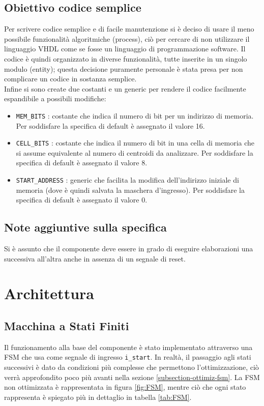 \documentclass{article}
\begin{document}
\subsection{Obiettivo codice semplice}
Per scrivere codice semplice e di facile manutenzione si è deciso di usare il meno possibile funzionalità algoritmiche (process), ciò per cercare di non utilizzare il linguaggio VHDL come se fosse un linguaggio di programmazione software. Il codice è quindi organizzato in diverse funzionalità, tutte inserite in un singolo modulo (entity); questa decisione puramente personale è stata presa per non complicare un codice in sostanza semplice.\\
Infine si sono create due costanti e un generic per rendere il codice facilmente espandibile a possibili modifiche:
\begin{itemize}
    \item \verb^MEM_BITS^ : costante che indica il numero di bit per un indirizzo di memoria. Per soddisfare la specifica di default è assegnato il valore 16.
    \item \verb^CELL_BITS^ : costante che indica il numero di bit in una cella di memoria che si assume equivalente al numero di centroidi da analizzare. Per soddisfare la specifica di default è assegnato il valore 8.
    \item \verb^START_ADDRESS^ : generic che facilita la modifica dell'indirizzo iniziale di memoria (dove è quindi salvata la maschera d'ingresso). Per soddisfare la specifica di default è assegnato il valore 0.
\end{itemize}

\subsection{Note aggiuntive sulla specifica}
Si è assunto che il componente deve essere in grado di eseguire elaborazioni una successiva all'altra anche in assenza di un segnale di reset.

\vspace{4mm}
\titlerule[0.4pt]


\pagebreak
\section{Architettura}

\subsection{Macchina a Stati Finiti}
Il funzionamento alla base del componente è stato implementato attraverso una FSM che usa come segnale di ingresso \verb^i_start^. In realtà, il passaggio agli stati successivi è dato da condizioni più complesse che permettono l'ottimizzazione, ciò verrà approfondito poco più avanti nella sezione \ref{subsection-ottimiz-fsm}.
La FSM non ottimizzata è rappresentata in figura \ref{fig:FSM}, mentre ciò che ogni stato rappresenta è spiegato più in dettaglio in tabella \ref{tab:FSM}.
\end{document}
